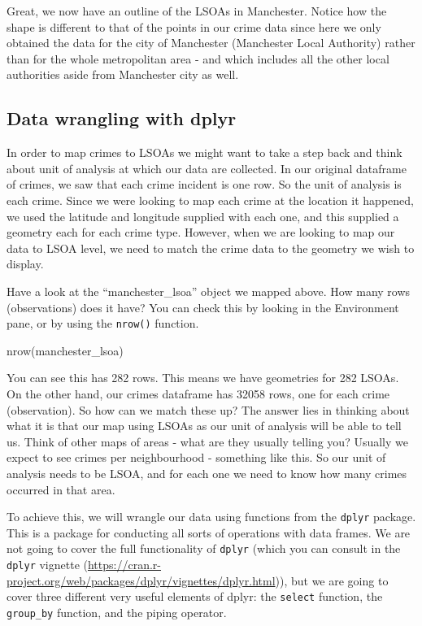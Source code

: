 \documentclass[
  krantz2]{krantz}
\makeatletter
\newenvironment{Shaded}{\begin{snugshade}}{\end{snugshade}}
\newcommand{\FunctionTok}[1]{\textcolor[rgb]{0,0,0}{#1}}
\newcommand{\NormalTok}[1]{#1}
\newenvironment{kframe}{%
\medskip{}
\setlength{\fboxsep}{.8em}
 \def\at@end@of@kframe{}%
 \ifinner\ifhmode%
  \def\at@end@of@kframe{\end{minipage}}%
  \begin{minipage}{\columnwidth}%
 \fi\fi%
 \def\FrameCommand##1{\hskip\@totalleftmargin \hskip-\fboxsep
 \colorbox{shadecolor}{##1}\hskip-\fboxsep
     \hskip-\linewidth \hskip-\@totalleftmargin \hskip\columnwidth}%
 \MakeFramed {\advance\hsize-\width
   \@totalleftmargin\z@ \linewidth\hsize
   \@setminipage}}%
 {\par\unskip\endMakeFramed%
 \at@end@of@kframe}
\renewenvironment{Shaded}{\begin{kframe}}{\end{kframe}}
\makeatother
\begin{document}
Great, we now have an outline of the LSOAs in Manchester. Notice how the shape is different to that of the points in our crime data since here we only obtained the data for the city of Manchester (Manchester Local Authority) rather than for the whole metropolitan area - and which includes all the other local authorities aside from Manchester city as well.

\hypertarget{data-wrangling-with-dplyr}{%
\subsection{Data wrangling with dplyr}\label{data-wrangling-with-dplyr}}

In order to map crimes to LSOAs we might want to take a step back and think about unit of analysis at which our data are collected. In our original dataframe of crimes, we saw that each crime incident is one row. So the unit of analysis is each crime. Since we were looking to map each crime at the location it happened, we used the latitude and longitude supplied with each one, and this supplied a geometry each for each crime type. However, when we are looking to map our data to LSOA level, we need to match the crime data to the geometry we wish to display.

Have a look at the ``manchester\_lsoa'' object we mapped above. How many rows (observations) does it have? You can check this by looking in the Environment pane, or by using the \texttt{nrow()} function.

\begin{Shaded}
\begin{Highlighting}[]
\FunctionTok{nrow}\NormalTok{(manchester\_lsoa)}
\end{Highlighting}
\end{Shaded}

You can see this has 282 rows. This means we have geometries for 282 LSOAs. On the other hand, our crimes dataframe has 32058 rows, one for each crime (observation). So how can we match these up? The answer lies in thinking about what it is that our map using LSOAs as our unit of analysis will be able to tell us. Think of other maps of areas - what are they usually telling you? Usually we expect to see crimes per neighbourhood - something like this. So our unit of analysis needs to be LSOA, and for each one we need to know how many crimes occurred in that area.

To achieve this, we will wrangle our data using functions from the \texttt{dplyr} package. This is a package for conducting all sorts of operations with data frames. We are not going to cover the full functionality of \texttt{dplyr} (which you can consult in the \texttt{dplyr} vignette (\url{https://cran.r-project.org/web/packages/dplyr/vignettes/dplyr.html})), but we are going to cover three different very useful elements of dplyr: the \texttt{select} function, the \texttt{group\_by} function, and the piping operator.
\end{document}
